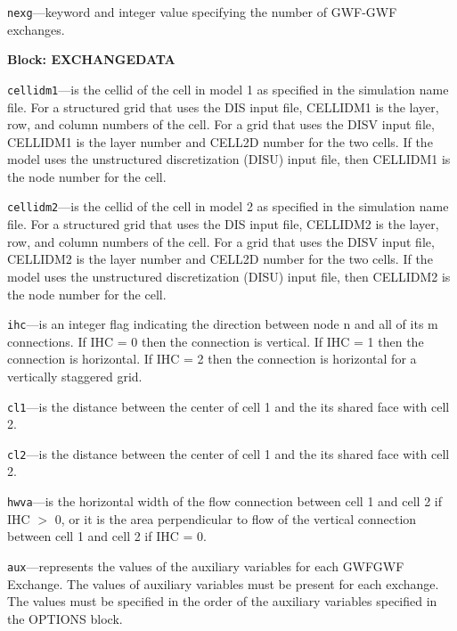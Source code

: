 \begin{description}
\item \texttt{nexg}---keyword and integer value specifying the number of GWF-GWF exchanges.

\end{description}
\item \textbf{Block: EXCHANGEDATA}

\begin{description}
\item \texttt{cellidm1}---is the cellid of the cell in model 1 as specified in the simulation name file. For a structured grid that uses the DIS input file, CELLIDM1 is the layer, row, and column numbers of the cell.   For a grid that uses the DISV input file, CELLIDM1 is the layer number and CELL2D number for the two cells.  If the model uses the unstructured discretization (DISU) input file, then CELLIDM1 is the node number for the cell.

\item \texttt{cellidm2}---is the cellid of the cell in model 2 as specified in the simulation name file. For a structured grid that uses the DIS input file, CELLIDM2 is the layer, row, and column numbers of the cell.   For a grid that uses the DISV input file, CELLIDM2 is the layer number and CELL2D number for the two cells.  If the model uses the unstructured discretization (DISU) input file, then CELLIDM2 is the node number for the cell.

\item \texttt{ihc}---is an integer flag indicating the direction between node n and all of its m connections. If IHC = 0 then the connection is vertical.  If IHC = 1 then the connection is horizontal. If IHC = 2 then the connection is horizontal for a vertically staggered grid.

\item \texttt{cl1}---is the distance between the center of cell 1 and the its shared face with cell 2.

\item \texttt{cl2}---is the distance between the center of cell 1 and the its shared face with cell 2.

\item \texttt{hwva}---is the horizontal width of the flow connection between cell 1 and cell 2 if IHC $>$ 0, or it is the area perpendicular to flow of the vertical connection between cell 1 and cell 2 if IHC = 0.

\item \texttt{aux}---represents the values of the auxiliary variables for each GWFGWF Exchange. The values of auxiliary variables must be present for each exchange. The values must be specified in the order of the auxiliary variables specified in the OPTIONS block.

\end{description}

